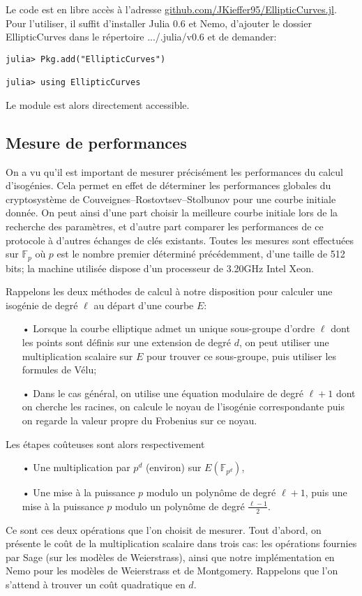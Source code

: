\documentclass[11pt,a4paper]{article}
\newcommand{\F}{\mathbb{F}}
\renewcommand{\v}{\vspace{5mm}}
\theoremstyle{definition}
\begin{document}
\v
Le code est en libre accès à l'adresse \url{github.com/JKieffer95/EllipticCurves.jl}. Pour l'utiliser, il suffit d'installer Julia 0.6 et Nemo, d'ajouter le dossier EllipticCurves dans le répertoire .../.julia/v0.6 et de demander: 
\begin{verbatim}
julia> Pkg.add("EllipticCurves")

julia> using EllipticCurves
\end{verbatim}
Le module est alors directement accessible.


\subsection{Mesure de performances}

On a vu qu'il est important de mesurer précisément les performances du calcul d'isogénies. Cela permet en effet de déterminer les performances globales du cryptosystème de Couveignes--Rostovtsev--Stolbunov pour une courbe initiale donnée. On peut ainsi d'une part choisir la meilleure courbe initiale lors de la recherche des paramètres, et d'autre part comparer les performances de ce protocole à d'autres échanges de clés existants. Toutes les mesures sont effectuées sur $\F_p$ où $p$ est le nombre premier déterminé précédemment, d'une taille de 512 bits; la machine utilisée dispose d'un processeur de 3.20GHz Intel Xeon.

Rappelons les deux méthodes de calcul à notre disposition pour calculer une isogénie de degré $\ell$ au départ d'une courbe $E$:
\begin{itemize}
\item[•] Lorsque la courbe elliptique admet un unique sous-groupe d'ordre $\ell$ dont les points sont définis sur une extension de degré $d$, on peut utiliser une multiplication scalaire sur $E$ pour trouver ce sous-groupe, puis utiliser les formules de Vélu;
\item[•] Dans le cas général, on utilise une équation modulaire de degré $\ell + 1$ dont on cherche les racines, on calcule le noyau de l'isogénie correspondante puis on regarde la valeur propre du Frobenius sur ce noyau.
\end{itemize}
Les étapes coûteuses sont alors respectivement
\begin{itemize}
\item[•] Une multiplication par $p^d$ (environ) sur $E(\F_{p^d})$,
\item[•] Une mise à la puissance $p$ modulo un polynôme de degré $\ell + 1$, puis une mise à la puissance $p$ modulo un polynôme de degré $\frac{\ell - 1}{2}$.
\end{itemize}
Ce sont ces deux opérations que l'on choisit de mesurer. Tout d'abord, on présente le coût de la multiplication scalaire dans trois cas: les opérations fournies par Sage (sur les modèles de Weierstrass), ainsi que notre implémentation en Nemo pour les modèles de Weierstrass et de Montgomery. Rappelons que l'on s'attend à trouver un coût quadratique en $d$.
\end{document}
